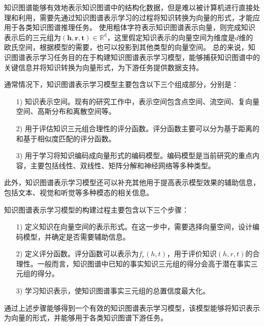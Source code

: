\documentclass[algorithmlist, AutoFakeBold, AutoFakeSlant, figurelist, tablelist, nomlist, engineering, openany]{seuthesix} %
\begin{document}
知识图谱能够有效地表示知识图谱中的结构化数据，但是难以被计算机进行直接处理和利用，需要先通过知识图谱表示学习的过程将知识转换为向量的形式，才能应用于各类知识图谱推理任务。
使用粗体字符表示知识图谱表示向量，则完成知识表示后的三元组为$\left(\bm{h}, \bm{r}, \bm{t}\right) \in \mathbb{R}^{\mathrm{d}}$，这里假定知识表示的向量空间为维度是$d$维的欧氏空间，根据模型的需要，也可以投影到其他类型的向量空间。
总的来说，知识图谱表示学习任务目的在于构建知识图谱表示学习模型，能够捕获知识图谱中的关键信息并将知识转换为向量形式，为下游任务提供数据支持。

通常情况下，知识图谱表示学习模型主要包含以下三个组成部分，分别是：
\begin{itemize}
  \item [1)] 知识表示空间。现有的研究工作中，表示空间包含点空间、流空间、复向量空间、高斯分布和离散空间等。
  \item [2)] 用于评估知识三元组合理性的评分函数。评分函数主要可以分为基于距离的和基于相似度匹配的评分函数。
  \item [3)] 用于学习将知识编码成向量形式的编码模型。编码模型是当前研究的重点内容，主要包括线性、双线性、矩阵分解和神经网络等多种类型。
\end{itemize}
此外，知识图谱表示学习模型还可以补充其他用于提高表示模型效果的辅助信息，包括文本、视觉和听觉等多种模态的相关信息。

知识图谱表示学习模型的构建过程主要包含以下三个步骤：
\begin{itemize}
  \item [1)] 定义知识在向量空间的表示形式。在这一步中，需要选择向量空间，设计编码模型，并确定是否需要辅助信息。
  \item [2)] 定义评分函数。评分函数可以表示为$f_r(h, t)$，用于评价知识$(h, r, t)$的合理性。一般而言，知识图谱中已知的事实知识三元组的得分会高于潜在事实三元组的得分。
  \item [3)] 学习知识表示，使知识图谱事实三元组的总置信度最大化。
\end{itemize}
通过上述步骤能够得到一个有效的知识图谱表示学习模型，该模型能够将知识表示为向量的形式，并能够用于各类知识图谱下游任务。
\end{document}
